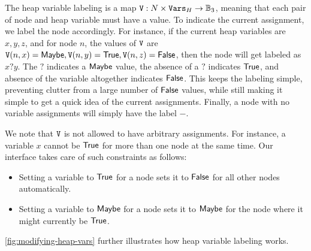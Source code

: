 The heap variable labeling is a map $\mathtt{V}: N \times \mathtt{Vars}_H \to \mathbb{B}_3$, meaning that each pair of node and heap variable must have a value. To indicate the current assignment, we label the node accordingly. For instance, if the current heap variables are $x, y, z$, and for node $n$, the values of $\mathtt{V}$ are $\mathtt{V}(n, x) = \mathsf{Maybe}, \mathtt{V}(n, y) = \mathsf{True}, \mathtt{V}(n, z) = \mathsf{False}$, then the node will get labeled as $x?y$. The $?$ indicates a $\mathsf{Maybe}$ value, the absence of a $?$ indicates $\mathsf{True}$, and absence of the variable altogether indicates $\mathsf{False}$. This keeps the labeling simple, preventing clutter from a large number of $\mathsf{False}$ values, while still making it simple to get a quick idea of the current assignments. Finally, a node with no variable assignments will simply have the label $-$.

We note that $\mathtt{V}$ is not allowed to have arbitrary assignments. For instance, a variable $x$ cannot be $\mathsf{True}$ for more than one node at the same time. Our interface takes care of such constraints as follows:

\begin{itemize}
  \item Setting a variable to $\mathsf{True}$ for a node sets it to $\mathsf{False}$ for all other nodes automatically.
  \item Setting a variable to $\mathsf{Maybe}$ for a node sets it to $\mathsf{Maybe}$ for the node where it might currently be $\mathsf{True}$.
\end{itemize}

\autoref{fig:modifying-heap-vars} further illustrates how heap variable labeling works.

